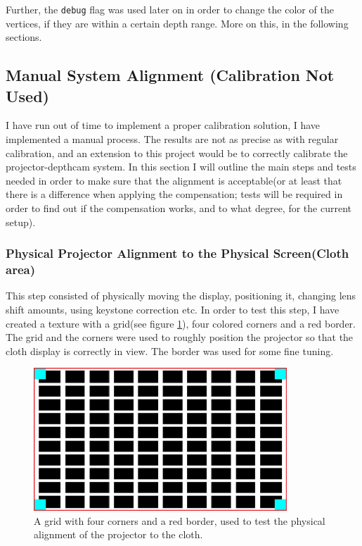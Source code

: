 \documentclass[]{article}
\begin{document}
Further, the \verb|debug| flag was used later on in order to change the color of the vertices, if they are within a certain depth range. More on this, in the following sections.


\subsection{Manual System Alignment (Calibration Not Used)}

I have run out of time to implement a proper calibration solution, I have implemented a manual process. The results are not as precise as with regular calibration, and an extension to this project would be to correctly calibrate the projector-depthcam system. In this section I will outline the main steps and tests needed in order to make sure that the alignment is acceptable(or at least that there is a difference when applying the compensation; tests will be required in order to find out if the compensation works, and to what degree, for the current setup).

\subsubsection{Physical Projector Alignment to the Physical Screen(Cloth area)}

This step consisted of physically moving the display, positioning it, changing lens shift amounts, using keystone correction etc. In order to test this step, I have created a texture with a grid(see figure \ref{fig:CalibrationGrid}), four colored corners and a red border. The grid and the corners were used to roughly position the projector so that the cloth display is correctly in view. The border was used for some fine tuning. 

\begin{figure}[hbtp]
    \centering
    \includegraphics[width=0.85\textwidth]{figures/CalibrationGrid.jpg}
    \caption{A grid with four corners and a red border, used to test the physical alignment of the projector to the cloth.}
    \label{fig:CalibrationGrid}
\end{figure}
\end{document}

